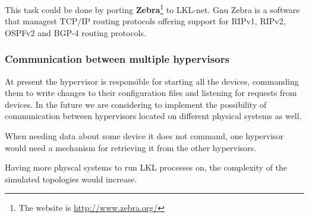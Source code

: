 This task could be done by porting \textbf{Zebra}\footnote{The website is \url{http://www.zebra.org/}} to LKL-net. Gnu Zebra is a software that managest TCP/IP routing protocols offering support for  RIPv1, RIPv2, OSPFv2 and BGP-4 routing protocols.

\subsubsection{Communication between multiple hypervisors}
\label{sec:hypervisor-comm}
At present the hypervisor is responsible for starting all the devices, commanding them to write changes to their configuration files and listening for requests from devices. In the future we are considering to implement the possibility of communication between hypervisors located on different physical systems as well. 

When needing data about some device it does not command, one hypervisor would need a mechanism for retrieving it from the other hypervisors. 

Having more physcal systems to run LKL processes on, the complexity of the simulated topologies would increase.
